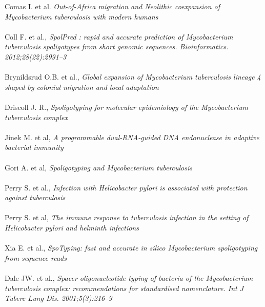 \documentclass[twoside,a4paper,11pt,frenchb,openany]{report}
\begin{document}

\renewcommand{\bibname}{Références}
\begin{thebibliography}{10}
Comas I. et al. \textit{Out-of-Africa migration and Neolithic coexpansion of Mycobacterium tuberculosis with modern humans}\\ \\

Coll F. et al., \textit{SpolPred : rapid and accurate prediction of Mycobacterium tuberculosis spoligotypes from short genomic sequences. Bioinformatics. 2012;28(22):2991–3}\\ \\

Brynildsrud O.B. et al., \textit{Global expansion of Mycobacterium tuberculosis lineage 4 shaped by colonial migration and local adaptation}\\ \\

Driscoll J. R., \textit{Spoligotyping for molecular epidemiology of the Mycobacterium tuberculosis complex}\\ \\

Jinek M. et al, \textit{A programmable dual-RNA-guided DNA endonuclease in adaptive bacterial immunity}\\ \\

Gori A. et al, \textit{Spoligotyping and Mycobacterium tuberculosis}\\ \\

Perry S. et al., \textit{Infection with Helicobacter pylori is associated with protection against tuberculosis}\\ \\

Perry S. et al, \textit{The immune response to tuberculosis infection in the setting of Helicobacter pylori and helminth infections}\\ \\

Xia E. et al., \textit{SpoTyping: fast and accurate in silico Mycobacterium spoligotyping from sequence reads}\\ \\ 

Dale JW. et al., \textit{Spacer oligonucleotide typing of bacteria of the Mycobacterium tuberculosis complex: recommendations for standardised nomenclature. Int J Tuberc Lung Dis. 2001;5(3):216–9}\\ \\


\end{thebibliography}
\end{document}
